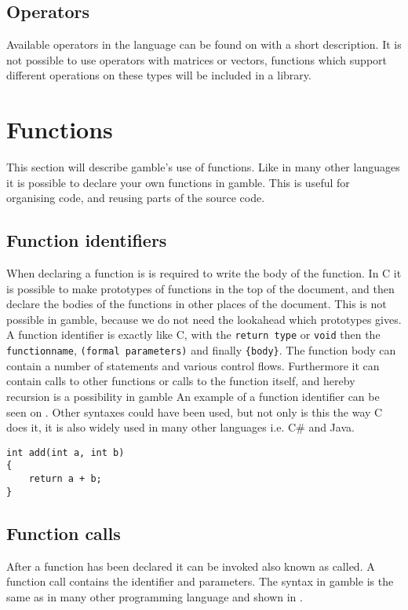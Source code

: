 \subsection*{Operators}
Available operators in the language can be found on  with a short description.  
It is not possible to use operators with matrices or vectors, functions which support different operations on these types will be included in a library.


\section{Functions}
This section will describe \gls{gamble}'s use of functions. 
Like in many other languages it is possible to declare your own functions in \gls{gamble}.
This is useful for organising code, and reusing parts of the source code.

\subsection*{Function identifiers}
When declaring a function is is required to write the body of the function.
In C it is possible to make prototypes of functions in the top of the document, and then declare the bodies of the functions in other places of the document. 
This is not possible in \gls{gamble}, because we do not need the lookahead which prototypes gives.
A function identifier is exactly like C, with the \texttt{return type} or \texttt{void} then the \texttt{functionname}, \texttt{(formal parameters)} and finally \texttt{\{body\}}.
The function body can contain a number of statements and various control flows.
Furthermore it can contain calls to other functions or calls to the function itself, and hereby recursion is a possibility in \gls{gamble}
An example of a function identifier can be seen on .
Other syntaxes could have been used, but not only is this the way C does it, it is also widely used in many other languages i.e. C\# and Java.

\begin{lstlisting}[caption={Function Identifier},label={lst:functionID},numbers=none]                                                        
int add(int a, int b)
{
	return a + b;
}
\end{lstlisting}

\subsection*{Function calls}
After a function has been declared it can be invoked also known as called. 
A function call contains the identifier and parameters. 
The syntax in \gls{gamble} is the same as in many other programming language and shown in . 

